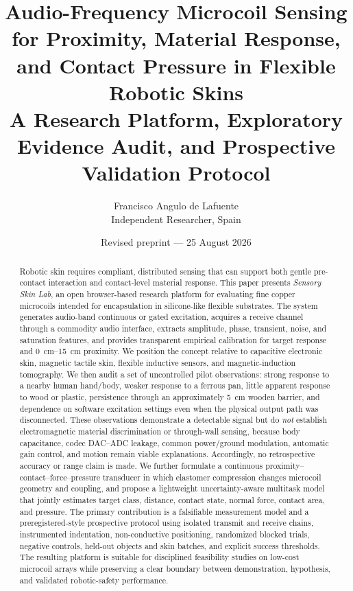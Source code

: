 \documentclass[10pt]{article}
\title{\vspace{-1.2cm}\textbf{Audio-Frequency Microcoil Sensing for Proximity, Material Response, and Contact Pressure in Flexible Robotic Skins}\\[0.45em]
\large A Research Platform, Exploratory Evidence Audit, and Prospective Validation Protocol}
\author{Francisco Angulo de Lafuente\\\small Independent Researcher, Spain}
\date{Revised preprint --- 25 August 2026}
\begin{document}
\maketitle
\begin{abstract}
Robotic skin requires compliant, distributed sensing that can support both gentle pre-contact interaction and contact-level material response. This paper presents \emph{Sensory Skin Lab}, an open browser-based research platform for evaluating fine copper microcoils intended for encapsulation in silicone-like flexible substrates. The system generates audio-band continuous or gated excitation, acquires a receive channel through a commodity audio interface, extracts amplitude, phase, transient, noise, and saturation features, and provides transparent empirical calibration for target response and \SIrange{0}{15}{\centi\metre} proximity. We position the concept relative to capacitive electronic skin, magnetic tactile skin, flexible inductive sensors, and magnetic-induction tomography. We then audit a set of uncontrolled pilot observations: strong response to a nearby human hand/body, weaker response to a ferrous pan, little apparent response to wood or plastic, persistence through an approximately \SI{5}{\centi\metre} wooden barrier, and dependence on software excitation settings even when the physical output path was disconnected. These observations demonstrate a detectable signal but do \emph{not} establish electromagnetic material discrimination or through-wall sensing, because body capacitance, codec DAC--ADC leakage, common power/ground modulation, automatic gain control, and motion remain viable explanations. Accordingly, no retrospective accuracy or range claim is made. We further formulate a continuous proximity--contact--force--pressure transducer in which elastomer compression changes microcoil geometry and coupling, and propose a lightweight uncertainty-aware multitask model that jointly estimates target class, distance, contact state, normal force, contact area, and pressure. The primary contribution is a falsifiable measurement model and a preregistered-style prospective protocol using isolated transmit and receive chains, instrumented indentation, non-conductive positioning, randomized blocked trials, negative controls, held-out objects and skin batches, and explicit success thresholds. The resulting platform is suitable for disciplined feasibility studies on low-cost microcoil arrays while preserving a clear boundary between demonstration, hypothesis, and validated robotic-safety performance.
\end{abstract}
\end{document}
